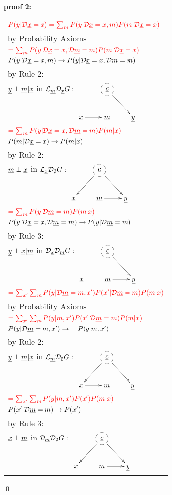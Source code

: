 {\bf * proof 2:}
\begin{longtable}{l}
$\color{red}
P(y|\cald\rvx=x)=
\sum_m
P(y|\cald\rvx=x, m)
P(m|\cald\rvx=x)$
\\
\quad by Probability Axioms
\\
$\color{red}=
\sum_m
P(y|\cald\rvx=x, \cald\rvm=m)
P(m|\cald\rvx=x)$
\\
\quad $P(y|\cald\rvx=x, m)\rarrow
P(y|\cald\rvx=x, \cald m=m)$
\\
\quad by Rule 2:
\\
\quad $\rvy\perp \rvm|\rvx$ in
$\call_\rvm\cald_\rvx G:$
$\xymatrix{
&*++[F-o]{\rvc}\ar[rd]
\\
\rvx\ar[r]
&\rvm
&\rvy
}$
\\
$\color{red}=
\sum_m
P(y|\cald\rvx=x, \cald\rvm=m)
P(m| x)$
\\
\quad $P(m|\cald\rvx=x)\rarrow P(m|x)$
\\
\quad by Rule 2:
\\
\quad
$\rvm\perp \rvx$ in
$\call_\rvx\cald_\emptyset G:$
$\xymatrix{
&*++[F-o]{\rvc}\ar[ld]\ar[rd]
\\
\rvx
&\rvm\ar[r]
&\rvy
}$
\\
$\color{red}=
\sum_m
P(y|\cald\rvm=m)
P(m|x)$
\\
\quad $P(y|\cald\rvx=x, \cald\rvm=m)
\rarrow
 P(y|\cald\rvm=m)$
\\
\quad by Rule 3:
\\
\quad
$\rvy\perp\rvx|\rvm$ in
$\cald_\rvx\cald_\rvm G:$
$\xymatrix{
&*++[F-o]{\rvc}\ar[rd]
\\
\rvx
&\rvm\ar[r]
&\rvy
}$
\\
$\color{red}=
\sum_{x'}
\sum_m
P(y|\cald\rvm=m, x')
P(x'|\cald\rvm=m)
P(m|x)$
\\
\quad by Probability Axioms
\\
$\color{red}=
\sum_{x'}
\sum_m
P(y|m, x')
P(x'|\cald\rvm=m)
P(m|x)$
\\
\quad $P(y|\cald\rvm=m, x')
\rarrow
\quad P(y|m, x')$
\\
\quad by Rule 2:
\\
\quad
$\rvy\perp\rvm|\rvx$ in
$\call_\rvm \cald_\emptyset G:$
$\xymatrix{
&*++[F-o]{\rvc}\ar[rd]\ar[ld]
\\
\rvx\ar[r]
&\rvm
&\rvy
}$
\\
$\color{red}=
\sum_{x'}
\sum_m
P(y|m, x')
P(x')
P(m|x)$
\\
\quad $P(x'|\cald\rvm=m)
\rarrow
P(x')$
\\
\quad by Rule 3:
\\
\quad
$\rvx\perp\rvm$ in
$\cald_\rvm \cald_\emptyset G:$
$\xymatrix{
&*++[F-o]{\rvc}\ar[rd]\ar[ld]
\\
\rvx
&\rvm\ar[r]
&\rvy
}$
\end{longtable}
\qed



